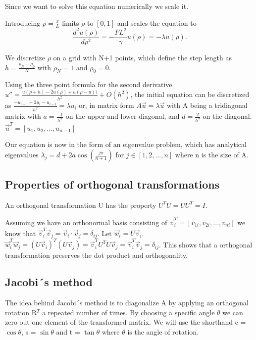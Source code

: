 Since we want to solve this equation numerically we scale it.

Introducing $ \rho = \frac{x}{L} $ limits $\rho$ to $[0, 1]$ and scales the
equation to
$$\frac{d^2 u(\rho)}{d\rho^2} = - \frac{FL^2}{\gamma} u(\rho) = -\lambda u(\rho).$$

We discretize $\rho$ on a grid with N+1 points, which
define the step length as $h = \frac{\rho_N - \rho_0}{N}$ with $\rho_N = 1$ and
$\rho_0 = 0$.

Using the three point formula for the second derivative $ u'' = \frac{u(\rho + h) - 2u(\rho) +
u(\rho -u))}{h^2} + O(h^2)$, the initial equation can be discretized as
$\frac{-u_{i+1} + 2u_i - u_{i-1}}{h^2} = \lambda u_i$
or, in matrix form
$ A \vec{u} = \lambda \vec{u}$
with A being a tridiagonal matrix with $a = \frac{-1}{h^2}$ on the upper and lower
diagonal, and $d = \frac{2}{h^2}$ on the diagonal. $\vec{u}^T = [u_1, u_2, ..., u_{n-1}]$

Our equation is now in the form of an eigenvalue problem, which has analytical
eigenvalues $\lambda_j = d + 2a\cos{(\frac{j\pi}{n+1})}$ for $j \in [1,2,...,n]$
where n is the size of A.

\subsection{Properties of orthogonal transformations}

An orthogonal transformation U has the property $U^T U = U U^T = I$.

Assuming we have an orthonormal basis consisting of $\vec{v}_i^T = [v_{1i},
v_{2i}, ... , v_{ni}]$ we know that $\vec{v}_i^T \vec{v}_j = \vec{v}_i \cdot
\vec{v}_j = \delta_{ij}$. Let $\vec{w}_i = U\vec{v}_i$. $\vec{w}_i^T \vec{w}_j =
(U\vec{v}_i)^T(U\vec{v}_j) = \vec{v}_i^T U^T U \vec{v}_j = \vec{v}_i^T \vec{v}_j
= \delta_{ij}$. This shows that a orthogonal transformation preserves the dot
product and orthogonality.

\subsection{Jacobi´s method}

The idea behind Jacobi´s method is to diagonalize A by applying an orthogonal
rotation R$^T$ a repeated number of times. By choosing a specific angle $\theta$
we can zero out one element of the transformed matrix. We will use the shorthand
c = $\cos{\theta}$, s = $\sin{\theta}$ and t = $\tan{\theta}$ where $\theta$ is
the angle of rotation.


